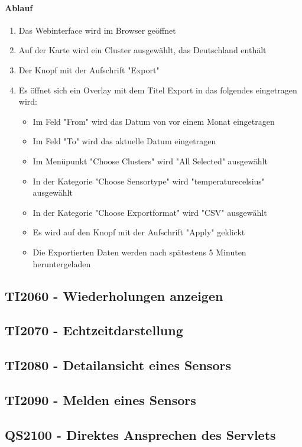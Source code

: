 \paragraph{Ablauf}
\begin{enumerate}
\item Das Webinterface wird im Browser geöffnet
\item Auf der Karte wird ein Cluster ausgewählt, das Deutschland enthält
\item Der Knopf mit der Aufschrift "Export"
\item Es öffnet sich ein Overlay mit dem Titel Export in das folgendes eingetragen wird:
\begin{itemize}
\item Im Feld "From" wird das Datum von vor einem Monat eingetragen
\item Im Feld "To" wird das aktuelle Datum eingetragen
\item Im Menüpunkt  "Choose Clusters" wird "All Selected" ausgewählt
\item In der Kategorie "Choose Sensortype" wird "temperature\textunderscore celsius" ausgewählt
\item In der Kategorie "Choose Exportformat" wird "CSV" ausgewählt
\item Es wird auf den Knopf mit der Aufschrift "Apply" geklickt
\item Die Exportierten Daten werden nach spätestens 5 Minuten heruntergeladen
\end{itemize}
\end{enumerate}
\szenarioGood
\subsection{TI2060 - Wiederholungen anzeigen}

\subsection{TI2070 - Echtzeitdarstellung}

\subsection{TI2080 - Detailansicht eines Sensors}

\subsection{TI2090 - Melden eines Sensors}

\subsection{QS2100 - Direktes Ansprechen des Servlets}

